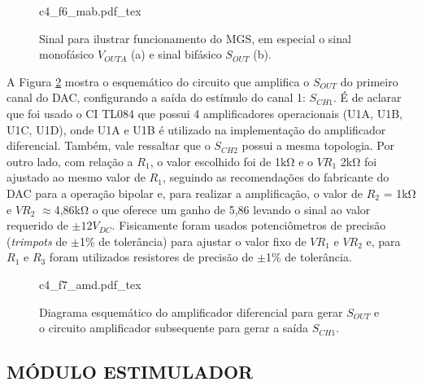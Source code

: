 \begin{figure}
    \centering %
    \small %
    \def\svgwidth{1\columnwidth}%
    {c4_f6_mab.pdf_tex}
    \caption{Sinal para ilustrar funcionamento do \acrshort{MGS}, em especial o sinal monofásico $V_{OUTA}$ (a) e sinal bifásico $S_{OUT}$ (b).}
    \label{fig:c4_f6_mab}
\end{figure}

A Figura \ref{fig:c4_f7_amd} mostra o esquemático do circuito que amplifica o $S_{OUT}$ do primeiro canal do \acrshort{DAC}, configurando a saída do estímulo do canal 1: $S_{CH1}$. É de aclarar que foi usado o \acrshort{CI} TL084 que possui 4 amplificadores operacionais (U1A, U1B, U1C, U1D), onde U1A e U1B é utilizado na implementação do amplificador diferencial. Também, vale ressaltar que o $S_{CH2}$ possui a mesma topologia. Por outro lado, com relação a $R_1$, o valor escolhido foi de 1k$\mathrm{\Omega}$ e o $VR_1$ 2k$\mathrm{\Omega}$ foi ajustado ao mesmo valor de $R_1$, seguindo as recomendações do fabricante do \acrshort{DAC} para a operação bipolar e, para realizar a amplificação, o valor de $R_2$ = 1k$\mathrm{\Omega}$ e $VR_2$ $\mathrm{\approx}$4,86k$\mathrm{\Omega}$ o que oferece um ganho de 5,86 levando o sinal ao valor requerido de $\mathrm{\pm}12V_{DC}$. Fisicamente foram usados potenciômetros de precisão (\textit{trimpots} de $\mathrm{\pm}$1\% de tolerância) para ajustar o valor fixo de $VR_1$ e $VR_2$ e, para $R_1$ e $R_3$ foram utilizados resistores de precisão de $\mathrm{\pm}$1\% de tolerância.

\vspace{0.3cm}
\begin{figure}[h]
    \centering %
    \small %
    \def\svgwidth{0.9\columnwidth}%
    {c4_f7_amd.pdf_tex}
    \caption{Diagrama esquemático do amplificador diferencial para gerar $S_{OUT}$ e o circuito amplificador subsequente para gerar a saída $S_{CH1}$.}
    \label{fig:c4_f7_amd}
\end{figure}

\subsection{MÓDULO ESTIMULADOR}
 
